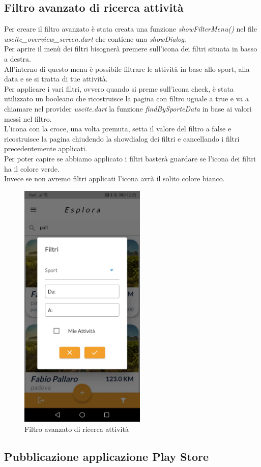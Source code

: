\subsection{Filtro avanzato di ricerca attività}
Per creare il filtro avanzato è stata creata una funzione \textit{showFilterMenu()} nel file \textit{uscite\_overview\_screen.dart} che contiene una \textit{showDialog}.\\
Per aprire il menù dei filtri bisognerà premere sull'icona dei filtri situata in basso a destra.\\
All'interno di questo menu è possibile filtrare le attività in base allo sport, alla data e se si tratta di tue attività.\\
Per applicare i vari filtri, ovvero quando si preme sull'icona check, è stata utilizzato un booleano che ricostruisce la pagina  con filtro uguale a true e va a chiamare nel provider \textit{uscite.dart} la funzione \textit{findBySporteData} in base ai valori messi nel filtro.\\
L'icona con la croce, una volta premuta, setta il valore del filtro a false e ricostruisce la pagina chiudendo la showdialog dei filtri e cancellando i filtri precedentemente applicati.\\
Per poter capire se abbiamo applicato i filtri basterà guardare se l'icona dei filtri ha il colore verde.\\
Invece se non avremo filtri applicati l'icona avrà il solito colore bianco.\\

\begin{figure}[htbp]	
	\centering
	\includegraphics[width=6cm]{immagini/filtroavanzato.jpeg}
	\caption{Filtro avanzato di ricerca attività}
	\label{fig:Filtro avanzato di ricerca attività}
\end{figure}

\newpage

\subsection{Pubblicazione applicazione Play Store}


